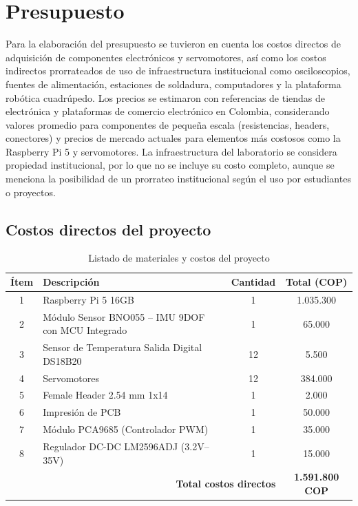 \chapter{Presupuesto}

Para la elaboración del presupuesto se tuvieron en cuenta los costos directos de adquisición de componentes electrónicos y servomotores, así como los costos indirectos prorrateados de uso de infraestructura institucional como osciloscopios, fuentes de alimentación, estaciones de soldadura, computadores y la plataforma robótica cuadrúpedo. Los precios se estimaron con referencias de tiendas de electrónica y plataformas de comercio electrónico en Colombia, considerando valores promedio para componentes de pequeña escala (resistencias, headers, conectores) y precios de mercado actuales para elementos más costosos como la Raspberry Pi 5 y servomotores. La infraestructura del laboratorio se considera propiedad institucional, por lo que no se incluye su costo completo, aunque se menciona la posibilidad de un prorrateo institucional según el uso por estudiantes o proyectos.

\section{Costos directos del proyecto}

\begin{table}[H]
\centering
\caption{Listado de materiales y costos del proyecto}
\label{tab:costos_materiales}
\begin{tabular}{|c|l|c|c|}
\hline
\textbf{Ítem} & \textbf{Descripción} & \textbf{Cantidad} & \textbf{Total (COP)} \\
\hline
1  & Raspberry Pi 5 16GB & 1 & 1.035.300 \\
2  & Módulo Sensor BNO055 – IMU 9DOF con MCU Integrado & 1 & 65.000 \\
3  & Sensor de Temperatura Salida Digital DS18B20 & 12 & 5.500 \\
4  & Servomotores & 12 & 384.000 \\
5  & Female Header 2.54 mm 1x14 & 1 & 2.000 \\
6  & Impresión de PCB & 1 & 50.000 \\
7  & Módulo PCA9685 (Controlador PWM) & 1 & 35.000 \\
8  & Regulador DC-DC LM2596ADJ (3.2V–35V) & 1 & 15.000 \\
\hline
\multicolumn{3}{|r|}{\textbf{Total costos directos}} & \textbf{1.591.800 COP} \\
\hline
\end{tabular}
\end{table}


